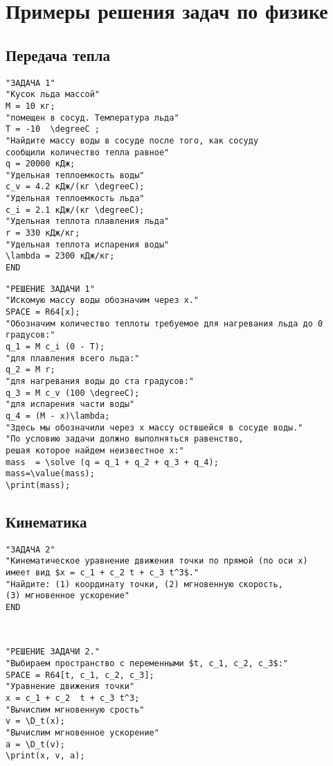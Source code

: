 \chapter{Примеры решения задач по физике}
\section{Передача тепла}

\begin{verbatim}
"ЗАДАЧА 1"
"Кусок льда массой"
M = 10 кг;
"помещен в сосуд. Температура льда"
T = -10  \degreeC ;
"Найдите массу воды в сосуде после того, как сосуду 
сообщили количество тепла равное"
q = 20000 кДж;
"Удельная теплоемкость воды"
c_v = 4.2 кДж/(кг \degreeC);
"Удельная теплоемкость льда"
c_i = 2.1 кДж/(кг \degreeC);
"Удельная теплота плавления льда"
r = 330 кДж/кг;
"Удельная теплота испарения воды"
\lambda = 2300 кДж/кг;
END
\end{verbatim}

\vspace*{3mm}

\begin{verbatim}
"РЕШЕНИЕ ЗАДАЧИ 1"
"Искомую массу воды обозначим через x."
SPACE = R64[x];
"Обозначим количество теплоты требуемое для нагревания льда до 0 градусов:"
q_1 = M c_i (0 - T);
"для плавления всего льда:"
q_2 = M r;
"для нагревания воды до ста градусов:"
q_3 = M c_v (100 \degreeC);
"для испарения части воды"
q_4 = (M - x)\lambda;
"Здесь мы обозначили через x массу оствшейся в сосуде воды."
"По условию задачи должно выполняться равенство,
решая которое найдем неизвестное x:"
mass  = \solve (q = q_1 + q_2 + q_3 + q_4);
mass=\value(mass);
\print(mass);
\end{verbatim}
\vspace*{-3mm}
 


\section{Кинематика} 

\begin{verbatim}
"ЗАДАЧА 2"
"Кинематическое уравнение движения точки по прямой (по оси x) 
имеет вид $x = c_1 + c_2 t + c_3 t^3$."
"Найдите: (1) координату точки, (2) мгновенную скорость,
(3) мгновенное ускорение" 
END
\end{verbatim}\vspace*{-3mm}
 
 \
 
\begin{verbatim}
"РЕШЕНИЕ ЗАДАЧИ 2."
"Выбираем пространство с переменными $t, c_1, c_2, c_3$:"
SPACE = R64[t, c_1, c_2, c_3];
"Уравнение движения точки"
x = c_1 + c_2  t + c_3 t^3;
"Вычислим мгновенную срость"
v = \D_t(x);
"Вычислим мгновенное ускорение"
a = \D_t(v);
\print(x, v, a);
\end{verbatim}\vspace*{-3mm}

